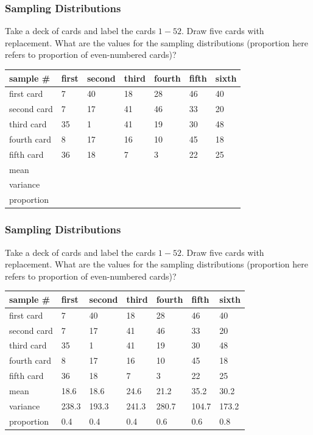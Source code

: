 \documentclass[xcolor=dvipsnames]{beamer}
\begin{document}
\begin{frame}
  \frametitle{Sampling Distributions}
{\ubung} Take a deck of cards and label the cards
$1-52$. Draw five cards with replacement. What are the values for the
sampling distributions (proportion here refers to proportion of
even-numbered cards)?

\medskip

\begin{tabular}{|l|l|l|l|l|l|l|}\hline
  sample \#   & first & second & third & fourth & fifth & sixth \\ \hline
  first card  & 7     & 40     & 18    & 28     & 46    & 40    \\ \hline
  second card & 7     & 17     & 41    & 46     & 33    & 20    \\ \hline
  third card  & 35    & 1      & 41    & 19     & 30    & 48    \\ \hline
  fourth card & 8     & 17     & 16    & 10     & 45    & 18    \\ \hline
  fifth card  & 36    & 18     & 7     & 3      & 22    & 25    \\ \hline
  mean        &       &        &       &        &       &       \\ \hline
  variance    &       &        &       &        &       &       \\ \hline
  proportion  &       &        &       &        &       &       \\ \hline
\end{tabular}
\end{frame}

\begin{frame}
  \frametitle{Sampling Distributions}
{\ubung} Take a deck of cards and label the cards
$1-52$. Draw five cards with replacement. What are the values for the
sampling distributions (proportion here refers to proportion of
even-numbered cards)?

\medskip

\begin{tabular}{|l|l|l|l|l|l|l|}\hline
  sample \#   & first & second & third & fourth & fifth & sixth \\ \hline
  first card  & 7     & 40     & 18    & 28     & 46    & 40    \\ \hline
  second card & 7     & 17     & 41    & 46     & 33    & 20    \\ \hline
  third card  & 35    & 1      & 41    & 19     & 30    & 48    \\ \hline
  fourth card & 8     & 17     & 16    & 10     & 45    & 18    \\ \hline
  fifth card  & 36    & 18     & 7     & 3      & 22    & 25    \\ \hline
  mean        & 18.6  & 18.6   & 24.6  & 21.2   & 35.2  & 30.2  \\ \hline
  variance    & 238.3 & 193.3  & 241.3 & 280.7  & 104.7 & 173.2 \\ \hline
  proportion  & 0.4   & 0.4    & 0.4   & 0.6    & 0.6   & 0.8   \\ \hline
\end{tabular}
\end{frame}
\end{document}
